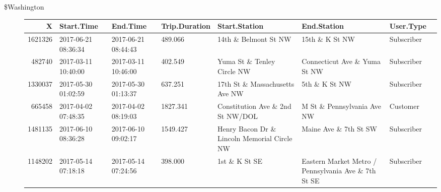 \documentclass[11pt]{article}
\begin{document}
\begin{description}
\item[\$Washington] \begin{tabular}{r|lllllll}
 X & Start.Time & End.Time & Trip.Duration & Start.Station & End.Station & User.Type\\
\hline
	 1621326                                                 & 2017-06-21 08:36:34                                     & 2017-06-21 08:44:43                                     &  489.066                                                & 14th \& Belmont St NW                                  & 15th \& K St NW                                        & Subscriber                                             \\
	  482740                                                 & 2017-03-11 10:40:00                                     & 2017-03-11 10:46:00                                     &  402.549                                                & Yuma St \& Tenley Circle NW                            & Connecticut Ave \& Yuma St NW                          & Subscriber                                             \\
	 1330037                                                 & 2017-05-30 01:02:59                                     & 2017-05-30 01:13:37                                     &  637.251                                                & 17th St \& Massachusetts Ave NW                        & 5th \& K St NW                                         & Subscriber                                             \\
	  665458                                                 & 2017-04-02 07:48:35                                     & 2017-04-02 08:19:03                                     & 1827.341                                                & Constitution Ave \& 2nd St NW/DOL                      & M St \& Pennsylvania Ave NW                            & Customer                                               \\
	 1481135                                                 & 2017-06-10 08:36:28                                     & 2017-06-10 09:02:17                                     & 1549.427                                                & Henry Bacon Dr \& Lincoln Memorial Circle NW           & Maine Ave \& 7th St SW                                 & Subscriber                                             \\
	 1148202                                                 & 2017-05-14 07:18:18                                     & 2017-05-14 07:24:56                                     &  398.000                                                & 1st \& K St SE                                         & Eastern Market Metro / Pennsylvania Ave \& 7th St SE   & Subscriber                                             \\

\end{tabular}
\end{description}
\end{document}
